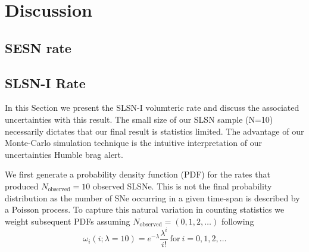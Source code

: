 \documentclass[a4paper,fleqn,usenatbib]{mnras}
\newcommand{\angus}[1]{\color{JungleGreen}#1\color{black}}
\newcommand{\chris}[1]{\color{orange}#1\color{black}}
\begin{document}


\section{Discussion}


\subsection{SESN rate}

\subsection{SLSN-I Rate}



In this Section we present the SLSN-I volumteric rate and discuss the associated uncertainties with this result. The small size of our SLSN sample (N=10) necessarily dictates that our final result is statistics limited. The advantage of our Monte-Carlo simulation technique is the intuitive interpretation of our uncertainties \angus{Humble brag alert}.

We first generate a probability density function (PDF) for the rates that produced $N_\mathrm{observed}=10$ observed SLSNe. This is not the final probability distribution as the number of SNe occurring in a given time-span is described by a Poisson process. To capture this natural variation in counting statistics we weight subsequent PDFs assuming $N_\mathrm{observed}=(0, 1, 2, \dots)$ following 
\begin{equation}
    \omega_i(i; \lambda=10)=e^{-\lambda }{\frac {\lambda ^{i}}{i!}} \mathrm{~for~} i=0, 1, 2, \dots
\end{equation}
\end{document}
